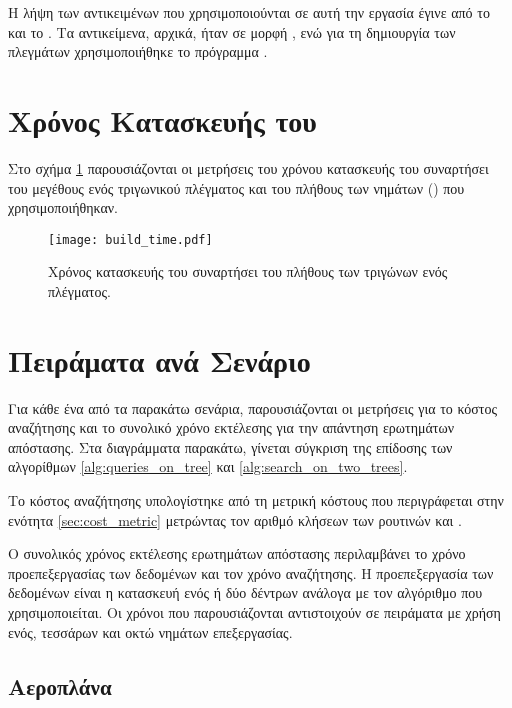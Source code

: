 Η λήψη των αντικειμένων που χρησιμοποιούνται σε αυτή την εργασία 
έγινε από το \cite{GrabCAD} και το 
\cite{3dcontentcentral}. 
Τα αντικείμενα, αρχικά, ήταν σε μορφή , ενώ για τη 
δημιουργία των πλεγμάτων χρησιμοποιήθηκε το πρόγραμμα 
.


\section{Χρόνος Κατασκευής του }
Στο σχήμα \ref{fig:build_time} παρουσιάζονται οι μετρήσεις του 
χρόνου κατασκευής του  συναρτήσει του μεγέθους ενός 
τριγωνικού πλέγματος και του πλήθους των νημάτων ()
που χρησιμοποιήθηκαν.

\begin{figure}[h]
    \centering
    \texttt{[image: build\_time.pdf]}
    \caption[Χρόνοι Κατασκευής του ]{
        Χρόνος κατασκευής του  συναρτήσει 
        του πλήθους των τριγώνων ενός πλέγματος.
    }
    \label{fig:build_time}
\end{figure}

\section{Πειράματα ανά Σενάριο}
Για κάθε ένα από τα παρακάτω σενάρια, παρουσιάζονται οι 
μετρήσεις για το κόστος αναζήτησης και το συνολικό χρόνο 
εκτέλεσης για την απάντηση ερωτημάτων απόστασης.
Στα διαγράμματα παρακάτω, γίνεται σύγκριση της επίδοσης των αλγορίθμων 
\ref{alg:queries_on_tree} και \ref{alg:search_on_two_trees}.

Το κόστος αναζήτησης υπολογίστηκε από τη μετρική κόστους 
που περιγράφεται στην ενότητα \ref{sec:cost_metric} 
μετρώντας τον αριθμό κλήσεων των ρουτινών 
 και .

Ο συνολικός χρόνος εκτέλεσης ερωτημάτων απόστασης περιλαμβάνει 
το χρόνο προεπεξεργασίας των δεδομένων και τον χρόνο αναζήτησης.
Η προεπεξεργασία των δεδομένων είναι η κατασκευή ενός ή δύο δέντρων 
ανάλογα με τον αλγόριθμο που χρησιμοποιείται.
Οι χρόνοι που παρουσιάζονται αντιστοιχούν σε πειράματα με χρήση 
ενός, τεσσάρων και οκτώ νημάτων επεξεργασίας.

\subsection{Αεροπλάνα}

